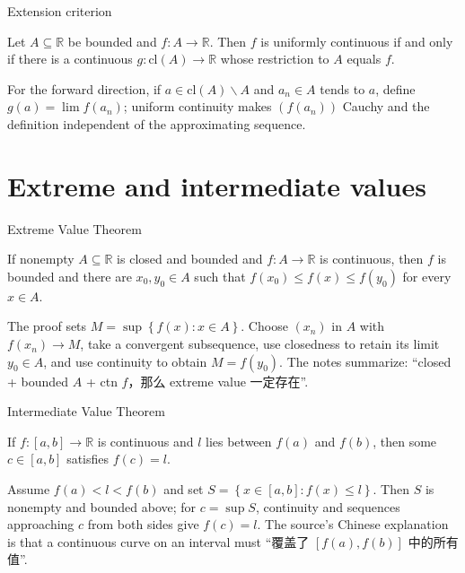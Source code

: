\begin{theorem}{Extension criterion}

Let \(A \subseteq \mathbb{R}\) be bounded and \(f:A\rightarrow\mathbb{R}\). Then \(f\) is uniformly continuous if and only if there is a continuous \(g:\text{cl}(A)\rightarrow\mathbb{R}\) whose restriction to \(A\) equals \(f\).

\end{theorem}

For the forward direction, if \(a \in \text{cl}(A) \smallsetminus A\) and \(a_{n} \in A\) tends to \(a\), define \(g(a) = \lim f\left( a_{n} \right)\); uniform continuity makes \(\left( {f\left( a_{n} \right)} \right)\) Cauchy and the definition independent of the approximating sequence.

\section{Extreme and intermediate values}

\begin{theorem}{Extreme Value Theorem}

If nonempty \(A \subseteq \mathbb{R}\) is closed and bounded and \(f:A\rightarrow\mathbb{R}\) is continuous, then \(f\) is bounded and there are \(x_{0},y_{0} \in A\) such that \(f\left( x_{0} \right) \leq f(x) \leq f\left( y_{0} \right)\) for every \(x \in A\).

\end{theorem}

The proof sets \(M = \sup\left\{ {f(x):x \in A} \right\}\). Choose \(\left( x_{n} \right)\) in \(A\) with \(f\left( x_{n} \right)\rightarrow M\), take a convergent subsequence, use closedness to retain its limit \(y_{0} \in A\), and use continuity to obtain \(M = f\left( y_{0} \right)\). The notes summarize: ``closed + bounded \(A\) + ctn \(f\)，那么 extreme value 一定存在''.

\begin{theorem}{Intermediate Value Theorem}

If \(f:\left\lbrack {a,b} \right\rbrack\rightarrow\mathbb{R}\) is continuous and \(l\) lies between \(f(a)\) and \(f(b)\), then some \(c \in \left\lbrack {a,b} \right\rbrack\) satisfies \(f(c) = l\).

\end{theorem}

Assume \(f(a) < l < f(b)\) and set \(S = \left\{ {x \in \left\lbrack {a,b} \right\rbrack:f(x) \leq l} \right\}\). Then \(S\) is nonempty and bounded above; for \(c = \sup S\), continuity and sequences approaching \(c\) from both sides give \(f(c) = l\). The source's Chinese explanation is that a continuous curve on an interval must ``覆盖了 \(\left\lbrack {f(a),f(b)} \right\rbrack\) 中的所有值''.

